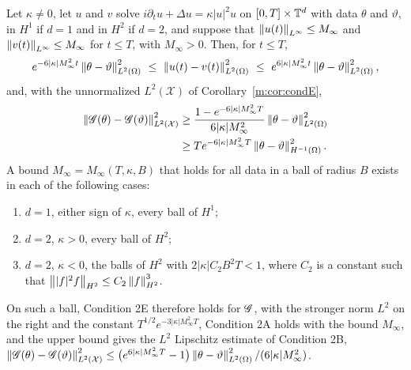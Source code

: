 \begin{proposition}\label{m:prop:nlsstab}
Let $\kappa\ne0$, let $u$ and $v$ solve $i\partial_tu+\Delta u=\kappa|u|^2u$ on $[0,T]\times\mathbb{T}^d$ with data $\theta$ and $\vartheta$, in $H^1$ if $d=1$ and in $H^2$ if $d=2$, and suppose that $\left\|u(t)\right\|_{L^\infty}\le M_\infty$ and $\left\|v(t)\right\|_{L^\infty}\le M_\infty$ for $t\le T$, with $M_\infty>0$. Then, for $t\le T$,
\[
e^{-6|\kappa|M_\infty^2t}\norm{\theta-\vartheta}^2_{L^2(\Omega)}\ \le\ \norm{u(t)-v(t)}^2_{L^2(\Omega)}\ \le\ e^{6|\kappa|M_\infty^2t}\norm{\theta-\vartheta}^2_{L^2(\Omega)},
\]
and, with the unnormalized $L^2(\mathcal X)$ of Corollary~\ref{m:cor:condE},
\[
\begin{aligned}
\left\|\mathscr{G}(\theta)-\mathscr{G}(\vartheta)\right\|^2_{L^2(\mathcal X)}&\ge\frac{1-e^{-6|\kappa|M_\infty^2T}}{6|\kappa|M_\infty^2}\left\|\theta-\vartheta\right\|^2_{L^2(\Omega)}\\
&\ge Te^{-6|\kappa|M_\infty^2T}\left\|\theta-\vartheta\right\|^2_{H^{-1}(\Omega)} .
\end{aligned}
\]
A bound $M_\infty=M_\infty(T,\kappa,B)$ that holds for all data in a ball of radius $B$ exists in each of the following cases:
\begin{enumerate}[label=(\alph*),nosep,leftmargin=2.2em]
\item $d=1$, either sign of $\kappa$, every ball of $H^1$;
\item $d=2$, $\kappa>0$, every ball of $H^2$;
\item $d=2$, $\kappa<0$, the balls of $H^2$ with $2|\kappa|C_2B^2T<1$, where $C_2$ is a constant such that $\left\||f|^2f\right\|_{H^2}\le C_2\left\|f\right\|^3_{H^2}$.
\end{enumerate}
On such a ball, Condition 2E therefore holds for $\mathscr{G}$, with the stronger norm $L^2$ on the right and the constant $T^{1/2}e^{-3|\kappa|M_\infty^2T}$, Condition 2A holds with the bound $M_\infty$, and the upper bound gives the $L^2$ Lipschitz estimate of Condition 2B, $\left\|\mathscr{G}(\theta)-\mathscr{G}(\vartheta)\right\|^2_{L^2(\mathcal X)}\le\big(e^{6|\kappa|M_\infty^2T}-1\big)\left\|\theta-\vartheta\right\|^2_{L^2(\Omega)}/(6|\kappa|M_\infty^2)$.
\end{proposition}

